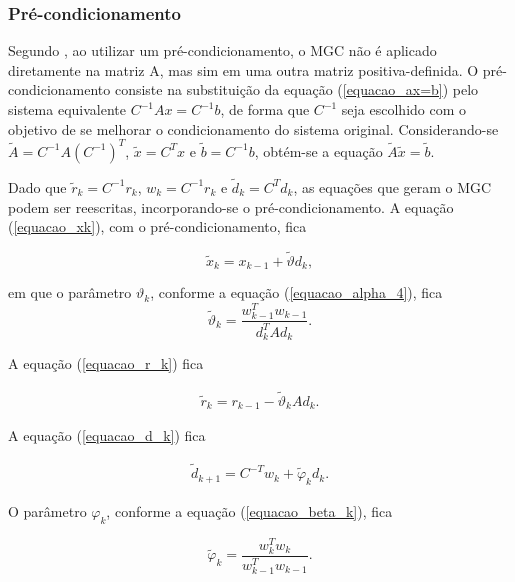 \subsubsection{Pré-condicionamento} \label{cap_pre_condicionamento}

Segundo , ao utilizar um pré-condicionamento, o MGC não é aplicado diretamente na matriz A, mas sim em uma outra matriz positiva-definida. O pré-condicionamento consiste na substituição da equação (\ref{equacao_ax=b}) pelo sistema equivalente $C^{-1} Ax = C^{-1} b$, de forma que $C^{-1}$ seja escolhido com o objetivo de se melhorar o condicionamento do sistema original. Considerando-se $\tilde{A} = C^{-1} A (C^{-1})^T$, $\tilde{x} = C^{T} x$ e $\tilde{b} = C^{-1} b$, obtém-se a equação $\tilde{A} \tilde{x} = \tilde{b}$.

Dado que $ \tilde{r}_k = C^{-1}r_k$, $w_k = C^{-1} r_k$ e $\tilde{d}_k = C^{T}d_k$, as equações que geram o MGC podem ser reescritas, incorporando-se o pré-condicionamento. A equação (\ref{equacao_xk}), com o pré-condicionamento, fica

\begin{equation}
\tilde{x}_{k} = x_{k-1} +   \tilde{\vartheta} d_{k},
\label{equacao_xk_tilde}
\end{equation}

\noindent em que o parâmetro $\vartheta_k$, conforme a equação (\ref{equacao_alpha_4}), fica
\begin{equation}
\tilde{\vartheta}_{k} = \frac {w^{T}_{k-1} w_{k-1}} { d^{T}_{k} A d_{k}}.  
\label{equacao_alpha_til}
\end{equation}

A equação (\ref{equacao_r_k}) fica

\begin{eqnarray}
\tilde{r}_{k} = r_{k-1} - \tilde{\vartheta}_{k} A d_{k}.
\label{equacao_r_k_tilde}
\end{eqnarray}

A equação (\ref{equacao_d_k}) fica

\begin{eqnarray}
\tilde{d}_{k+1} = C^{-T} w_{k} + \tilde{\varphi}_{k} d_{k}.
\label{equacao_d_k_tilde}
\end{eqnarray} 

O parâmetro $\varphi_k$, conforme a equação (\ref{equacao_beta_k}), fica

\begin{equation}
\tilde{\varphi}_{k} = \frac{w^T_{k} w_{k}} {w^T_{k-1} w_{k-1}}. 
\label{equacao_beta_k_tilde}
\end{equation}

